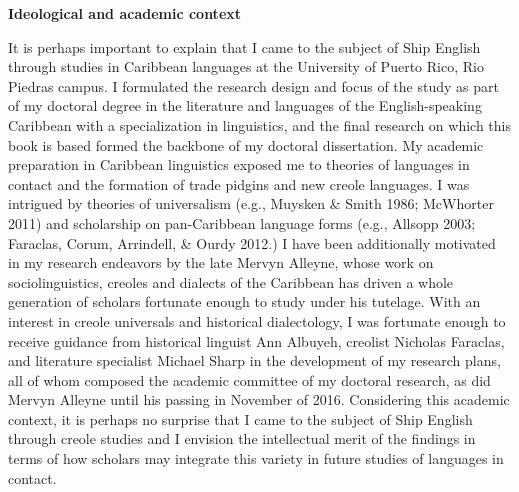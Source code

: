 \setcounter{listWWNumxiiileveli}{0}
\begin{listWWNumxiiileveli}
\item 
\setcounter{listWWNumxiiilevelii}{1}
\begin{listWWNumxiiilevelii}
\item 
\setcounter{listWWNumxiiileveliii}{1}
\begin{listWWNumxiiileveliii}
\item 
\begin{styleNormali}
\textbf{Ideological and academic context}
\end{styleNormali}

\end{listWWNumxiiileveliii}
\end{listWWNumxiiilevelii}
\end{listWWNumxiiileveli}
\begin{styleNormali}
It is perhaps important to explain that I came to the subject of Ship English through studies in Caribbean languages at the University of Puerto Rico, Rio Piedras campus. I formulated the research design and focus of the study as part of my doctoral degree in the literature and languages of the English-speaking Caribbean with a specialization in linguistics, and the final research on which this book is based formed the backbone of my doctoral dissertation. My academic preparation in Caribbean linguistics exposed me to theories of languages in contact and the formation of trade pidgins and new creole languages. I was intrigued by theories of universalism (e.g., Muysken \& Smith 1986; McWhorter 2011) and scholarship on pan-Caribbean language forms (e.g., Allsopp 2003; Faraclas, Corum, Arrindell, \& Ourdy 2012.) I have been additionally motivated in my research endeavors by the late Mervyn Alleyne, whose work on sociolinguistics, creoles and dialects of the Caribbean has driven a whole generation of scholars fortunate enough to study under his tutelage. With an interest in creole universals and historical dialectology, I was fortunate enough to receive guidance from historical linguist Ann Albuyeh, creolist Nicholas Faraclas, and literature specialist Michael Sharp in the development of my research plans, all of whom composed the academic committee of my doctoral research, as did Mervyn Alleyne until his passing in November of 2016. Considering this academic context, it is perhaps no surprise that I came to the subject of Ship English through creole studies and I envision the intellectual merit of the findings in terms of how scholars may integrate this variety in future studies of languages in contact.
\end{styleNormali}


